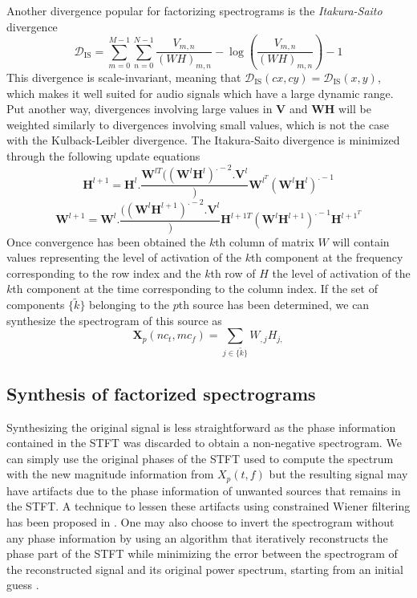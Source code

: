 Another divergence popular for factorizing spectrograms is the
\textit{Itakura-Saito} divergence 
\[
    \mathcal{D}_{\text{IS}} =
    \sum_{m=0}^{M-1}\sum_{n=0}^{N-1} \frac{V_{m,n}}{(WH)_{m,n}}
    - \log \left(\frac{V_{m,n}}{(WH)_{m,n}}\right) -1
\]
This divergence is scale-invariant, meaning that
$\mathcal{D}_{\text{IS}}(cx,cy)=\mathcal{D}_{\text{IS}}(x,y)$, which makes it
well suited for audio signals which have a large dynamic range. Put another way,
divergences involving large values in $\boldsymbol{V}$ and
$\boldsymbol{W}\boldsymbol{H}$ will be weighted similarly to divergences
involving small values, which is not the case with the Kulback-Leibler divergence.
The Itakura-Saito divergence is minimized through the following update equations
\[
    \boldsymbol{H}^{l+1}
    =
    \boldsymbol{H}^{l}.
    \frac{\boldsymbol{W}^{lT}((\boldsymbol{W}^{l}\boldsymbol{H}^{l})^{.-2}.\boldsymbol{V}^{l}})
    {\boldsymbol{W}^{l}^{T}(\boldsymbol{W}^{l}\boldsymbol{H}^{l})^{.-1}}
\]
\[
    \boldsymbol{W}^{l+1}
    =
    \boldsymbol{W}^{l}.
    \frac{((\boldsymbol{W}^{l}\boldsymbol{H}^{l+1})^{.-2}.\boldsymbol{V}^{l}})\boldsymbol{H}^{l+1T}
    {(\boldsymbol{W}^{l}\boldsymbol{H}^{l+1})^{.-1}\boldsymbol{H}^{l+1}^{T}}
\]
Once convergence has been obtained the $k$th column of matrix $W$ will contain
values representing the level of activation of the $k$th component at the
frequency corresponding to the row index and the $k$th row of $H$ the level of
activation of the $k$th component at the time corresponding to the column index.
If the set of components $\{ \tilde{k} \}$ belonging to the $p$th source has
been determined, we can synthesize the spectrogram of this source as
\[
    \boldsymbol{X}_{p}(nc_{t},mc_{f}) =
    \sum_{j \in \{\tilde{k}\}}W_{,j}H_{j,}
\]
 
\subsection{Synthesis of factorized spectrograms}

Synthesizing the original signal is less straightforward as the phase
information contained in the STFT was discarded to obtain a non-negative
spectrogram. We can simply use the
original phases of the STFT used to compute the spectrum with the new magnitude
information from $X_{p}(t,f)$ but the resulting signal may have artifacts due to
the phase information of unwanted sources that remains in the STFT. A technique
to lessen these artifacts using constrained Wiener filtering has been proposed in
\cite{le2013consistent}. One may also choose to invert the spectrogram without
any phase information by using an algorithm that iteratively reconstructs the
phase part of the STFT while minimizing the error
between the spectrogram of the reconstructed signal and its original power
spectrum, starting from an initial guess \cite{griffin1984signal}.

